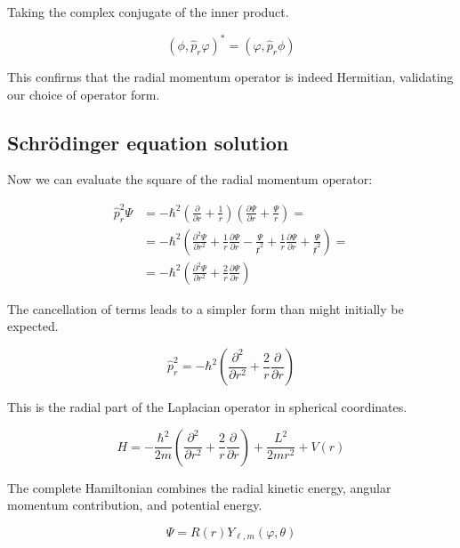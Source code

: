 \documentclass[italian]{HKNdocument}
\begin{document}
Taking the complex conjugate of the inner product.

\begin{equation}
\left(\phi, \hat{p}_{r} \varphi\right)^{*}=\left(\varphi, \hat{p}_{r} \phi\right) \label{eq:9.26}
\end{equation}

This confirms that the radial momentum operator is indeed Hermitian, validating our choice of operator form.

\subsection{Schrödinger equation solution}
Now we can evaluate the square of the radial momentum operator:

\begin{align}
\hat{p}_{r}^{2} \Psi & =-\hbar^{2}\left(\frac{\partial}{\partial r}+\frac{1}{r}\right)\left(\frac{\partial \Psi}{\partial r}+\frac{\Psi}{r}\right)= \\
& =-\hbar^{2}\left(\frac{\partial^{2} \Psi}{\partial r^{2}}+\frac{1}{r} \frac{\partial \Psi}{\partial r}-\frac{\Psi}{\not r^{2}}+\frac{1}{r} \frac{\partial \Psi}{\partial r}+\frac{\Psi}{\not r^{2}}\right)=  \label{eq:9.27}\\
& =-\hbar^{2}\left(\frac{\partial^{2} \Psi}{\partial r^{2}}+\frac{2}{r} \frac{\partial \Psi}{\partial r}\right)
\end{align}

The cancellation of terms leads to a simpler form than might initially be expected.

\begin{equation}
\hat{p}_{r}^{2}=-\hbar^{2}\left(\frac{\partial^{2}}{\partial r^{2}}+\frac{2}{r} \frac{\partial}{\partial r}\right) \label{eq:9.28}
\end{equation}

This is the radial part of the Laplacian operator in spherical coordinates.

\begin{equation}
H=-\frac{\hbar^{2}}{2 m}\left(\frac{\partial^{2}}{\partial r^{2}}+\frac{2}{r} \frac{\partial}{\partial r}\right)+\frac{L^{2}}{2 m r^{2}}+V(r) \label{eq:9.29}
\end{equation}

The complete Hamiltonian combines the radial kinetic energy, angular momentum contribution, and potential energy.

\begin{equation}
\Psi=R(r) Y_{\ell, m}(\varphi, \theta) \label{eq:9.30}
\end{equation}
\end{document}
